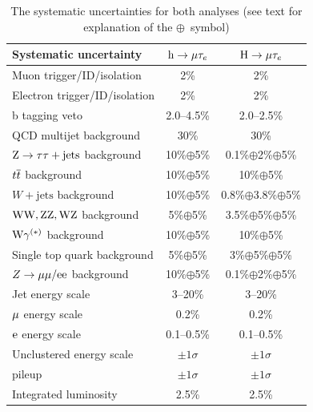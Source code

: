 \begin{table}[htpb]
  \begin{center}
    \caption{The systematic uncertainties for both analyses
      (see text for explanation of the $\oplus$~symbol)}
\begin{tabular}{l*{2}{c}} \hline
Systematic  uncertainty            & $\text{h} \to \mu \tau_{e}$& $\text{H} \to \mu \tau_{e}$  \\ \hline
Muon  trigger/ID/isolation         &          2\%           &        2\%         \\
Electron trigger/ID/isolation      &          2\%           &        2\%           \\
b tagging veto                     &      2.0--4.5\%        &      2.0--2.5\%         \\ 
[\cmsTabSkip]
QCD multijet background            &          30\%          &        30\%                \\
$\text{Z} \to \tau \tau+\textrm{jets}$ background    &    10\%$\oplus$5\%     & 0.1\%$\oplus$2\%$\oplus$5\%         \\
$t\overline{t}$ background                  &    10\%$\oplus$5\%     &   10\%$\oplus$5\%              \\
$W+\textrm{jets}$ background       &    10\%$\oplus$5\%     & 0.8\%$\oplus$3.8\%$\oplus$5\%        \\
$\text{W}\text{W},\text{Z}\text{Z},\text{W}\text{Z}$ background  &    5\%$\oplus$5\%      &  3.5\%$\oplus$5\%$\oplus$5\%       \\
$\text{W}\gamma^{(*)}$ background       &    10\%$\oplus$5\%     &  10\%$\oplus$5\%       \\
Single top quark background        &    5\%$\oplus$5\%      & 3\%$\oplus$5\%$\oplus$5\%    \\ 
$Z\to\mu\mu/\text{e}\text{e}$ background   &    10\%$\oplus$5\%     & 0.1\%$\oplus$2\%$\oplus$5\%     \\
[\cmsTabSkip]
Jet energy scale                   &        3--20\%         &        3--20\%                         \\
$\mu$ energy scale                &        0.2\%           &        0.2\%                              \\
 $\text{e}$ energy scale                &        0.1--0.5\%      &        0.1--0.5\%                          \\
Unclustered energy scale           &        $\pm 1 \sigma$  &     $\pm 1 \sigma$                            \\
pileup                             &        $\pm 1 \sigma$  &     $\pm 1 \sigma$                            \\
[\cmsTabSkip]
Integrated luminosity              &         2.5\%          &       2.5\%                                        \\ \hline
\end{tabular}
\label{table:syst}
\end{center}
\end{table}


